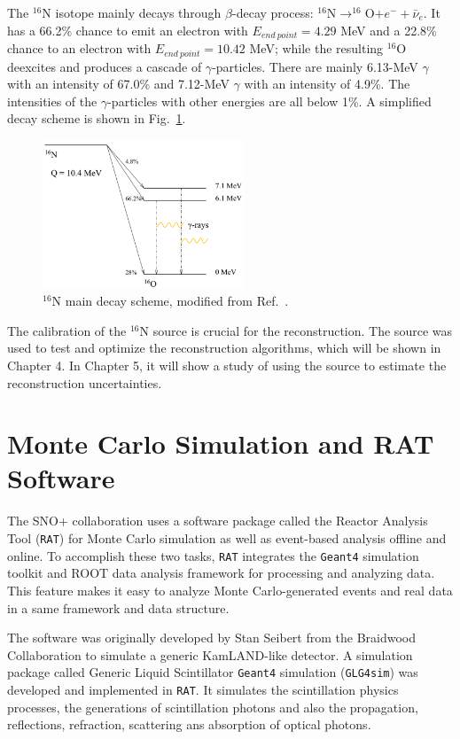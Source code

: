The $^{16}$N isotope mainly decays through $\beta$-decay process: $^{16}$N$\to ^{16}$O$+e^-+\bar{\nu}_e$. It has a 66.2\% chance to emit an electron with $E_{end~point}=4.29$ MeV and a 22.8\% chance to an electron with $E_{end~point}=10.42$ MeV; while the resulting $^{16}$O deexcites and produces a cascade of $\gamma$-particles. There are mainly 6.13-MeV $\gamma$ with an intensity of 67.0\% and 7.12-MeV $\gamma$ with an intensity of 4.9\%. The intensities of the $\gamma$-particles with other energies are all below 1\%\cite{nndc}. A simplified decay scheme is shown in Fig.~\ref{n16decay}.

\begin{figure}[!htb]
	\centering
	\includegraphics[width=6cm]{n16_decay.png}
	\caption[$^{16}$N main decay scheme]{$^{16}$N main decay scheme, modified from Ref.~\cite{dragowsky200216n}.}
	\label{n16decay}
\end{figure}

The calibration of the $^{16}$N source is crucial for the reconstruction. The source was used to test and optimize the reconstruction algorithms, which will be shown in Chapter 4. In Chapter 5, it will show a study of using the source to estimate the reconstruction uncertainties.

\section{Monte Carlo Simulation and RAT Software}\label{sect:rat}
The SNO+ collaboration uses a software package called the Reactor Analysis Tool (\texttt{RAT}) for Monte Carlo simulation as well as event-based analysis offline and online. To accomplish these two tasks, \texttt{RAT} integrates the \texttt{Geant4} simulation toolkit\cite{agostinelli2003geant4} and ROOT data analysis framework\cite{brunroot} for processing and analyzing data. This feature makes it easy to analyze Monte Carlo-generated events and real data in a same framework and data structure.

The software was originally developed by Stan Seibert from the Braidwood Collaboration to simulate a generic KamLAND-like detector\cite{ratManual}. A simulation package called Generic Liquid Scintillator \texttt{Geant4} simulation (\texttt{GLG4sim}) was developed and implemented in \texttt{RAT}\cite{horton2006introduction}. It simulates the scintillation physics processes, the generations of scintillation photons and also the propagation, reflections, refraction, scattering ans absorption of optical photons\cite{dunger2018topological}.

